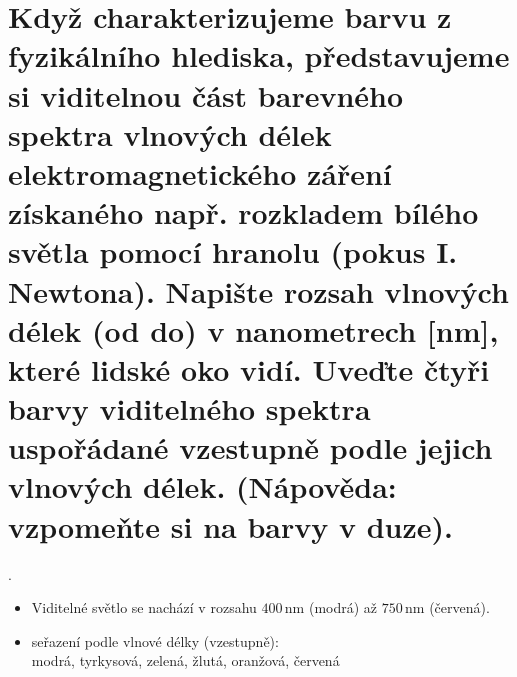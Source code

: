 \section{Když charakterizujeme barvu z fyzikálního hlediska, představujeme si viditelnou část barevného spektra vlnových 
délek elektromagnetického záření získaného např. rozkladem bílého světla pomocí hranolu (pokus I. Newtona). Napište 
rozsah vlnových délek (od do) v nanometrech [nm], které lidské oko vidí. Uveďte čtyři barvy viditelného spektra 
uspořádané vzestupně podle jejich vlnových délek. (Nápověda: vzpomeňte si na barvy v duze).}.
\begin{itemize}
  \item
    Viditelné světlo se nachází v rozsahu $400\,\mathrm{nm}$ (modrá) až $750\,\mathrm{nm}$ (červená).
  \item{seřazení podle vlnové délky (vzestupně)\footnotemark{}:\\}
    modrá, tyrkysová, zelená, žlutá, oranžová, červená
\end{itemize}
